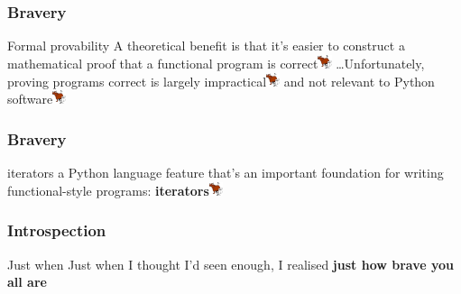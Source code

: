 {\begin{frame}
\frametitle{Bravery}
\begin{block}{Formal provability}
A theoretical benefit is that it’s easier to construct a mathematical proof that a functional program is correct\includegraphics[height=0.4cm]{image/bullshit.jpg} \ldots Unfortunately, proving programs correct is largely impractical\includegraphics[height=0.4cm]{image/bullshit.jpg} and not relevant to Python software\includegraphics[height=0.4cm]{image/bullshit.jpg}
\end{block}
\end{frame}


\begin{frame}
\frametitle{Bravery}
\begin{block}{iterators}
a Python language feature that's an important foundation for writing functional-style programs: \textbf{iterators}\includegraphics[height=0.4cm]{image/bullshit.jpg}
\end{block}
\end{frame}

}

{

\begin{frame}
\frametitle{Introspection}
\begin{block}{Just when}
Just when I thought I'd seen enough, I realised \textbf{just how brave you all are}
\end{block}
\end{frame}

}